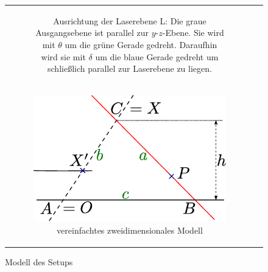 \documentclass[ngerman,a4paper,parskip=half]{scrartcl}
\begin{document}
\begin{figure}
\begin{tabular}{cc}
{\begin{subfigure}{0.4\textwidth}
			\caption{Ausrichtung der Laserebene L: Die graue Ausgangsebene ist parallel zur $y$-$z$-Ebene. Sie wird mit $\theta$ um die grüne Gerade gedreht. Daraufhin wird sie mit $\delta$ um die blaue Gerade gedreht um schließlich parallel zur Laserebene zu liegen.}
			\label{fig:triangulation_skew_pitch}
		\end{subfigure}
		}\\
		\begin{subfigure}{0.45\textwidth}
			\includegraphics[width=\textwidth]{includes/triangulation2d}
			\caption{vereinfachtes zweidimensionales Modell}
			\label{fig:triangulation2d}
		\end{subfigure}
		&
	\end{tabular}
%
	\caption{Modell des Setups}
\end{figure}
\end{document}

